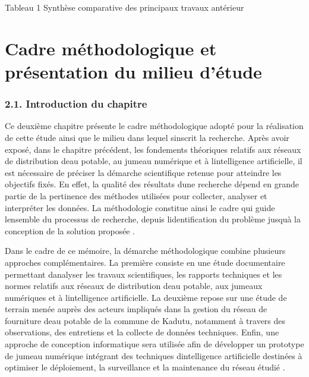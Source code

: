 \documentclass[12pt,a4paper,oneside]{report}
\begin{document}
Tableau 1 Synthèse comparative des principaux travaux antérieur

\chapter{Cadre méthodologique et présentation du milieu d'étude}\label{chapitre-ii-cadre-muxe9thodologique-et-pruxe9sentation-du-milieu-duxe9tude}

\subsection{2.1. Introduction du
chapitre}\label{introduction-du-chapitre}

Ce deuxième chapitre présente le cadre méthodologique adopté pour la
réalisation de cette étude ainsi que le milieu dans lequel
s\textquotesingle inscrit la recherche. Après avoir exposé, dans le
chapitre précédent, les fondements théoriques relatifs aux réseaux de
distribution d\textquotesingle eau potable, au jumeau numérique et à
l\textquotesingle intelligence artificielle, il est nécessaire de
préciser la démarche scientifique retenue pour atteindre les objectifs
fixés. En effet, la qualité des résultats d\textquotesingle une
recherche dépend en grande partie de la pertinence des méthodes
utilisées pour collecter, analyser et interpréter les données. La
méthodologie constitue ainsi le cadre qui guide
l\textquotesingle ensemble du processus de recherche, depuis
l\textquotesingle identification du problème jusqu\textquotesingle à la
conception de la solution proposée \cite{ref75}.

Dans le cadre de ce mémoire, la démarche méthodologique combine
plusieurs approches complémentaires. La première consiste en une étude
documentaire permettant d\textquotesingle analyser les travaux
scientifiques, les rapports techniques et les normes relatifs aux
réseaux de distribution d\textquotesingle eau potable, aux jumeaux
numériques et à l\textquotesingle intelligence artificielle. La deuxième
repose sur une étude de terrain menée auprès des acteurs impliqués dans
la gestion du réseau de fourniture d\textquotesingle eau potable de la
commune de Kadutu, notamment à travers des observations, des entretiens
et la collecte de données techniques. Enfin, une approche de conception
informatique sera utilisée afin de développer un prototype de jumeau
numérique intégrant des techniques d\textquotesingle intelligence
artificielle destinées à optimiser le déploiement, la surveillance et la
maintenance du réseau étudié \cite{ref81}.
\end{document}
